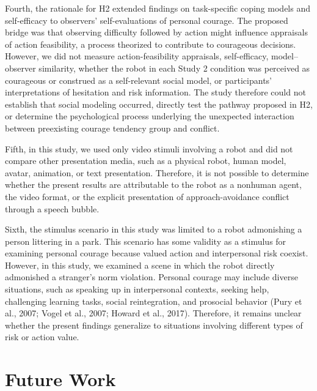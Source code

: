 \documentclass[utf8]{FrontiersinHarvard}
\begin{document}
Fourth, the rationale for H2 extended findings on task-specific coping models and self-efficacy to observers' self-evaluations of personal courage. The proposed bridge was that observing difficulty followed by action might influence appraisals of action feasibility, a process theorized to contribute to courageous decisions. However, we did not measure action-feasibility appraisals, self-efficacy, model--observer similarity, whether the robot in each Study 2 condition was perceived as courageous or construed as a self-relevant social model, or participants' interpretations of hesitation and risk information. The study therefore could not establish that social modeling occurred, directly test the pathway proposed in H2, or determine the psychological process underlying the unexpected interaction between preexisting courage tendency group and conflict.

Fifth, in this study, we used only video stimuli involving a robot and did not compare other presentation media, such as a physical robot, human model, avatar, animation, or text presentation. Therefore, it is not possible to determine whether the present results are attributable to the robot as a nonhuman agent, the video format, or the explicit presentation of approach-avoidance conflict through a speech bubble.

Sixth, the stimulus scenario in this study was limited to a robot admonishing a person littering in a park. This scenario has some validity as a stimulus for examining personal courage because valued action and interpersonal risk coexist. However, in this study, we examined a scene in which the robot directly admonished a stranger's norm violation. Personal courage may include diverse situations, such as speaking up in interpersonal contexts, seeking help, challenging learning tasks, social reintegration, and prosocial behavior (Pury et al., 2007; Vogel et al., 2007; Howard et al., 2017). Therefore, it remains unclear whether the present findings generalize to situations involving different types of risk or action value.

\section{Future Work}\label{future-work}
\end{document}
